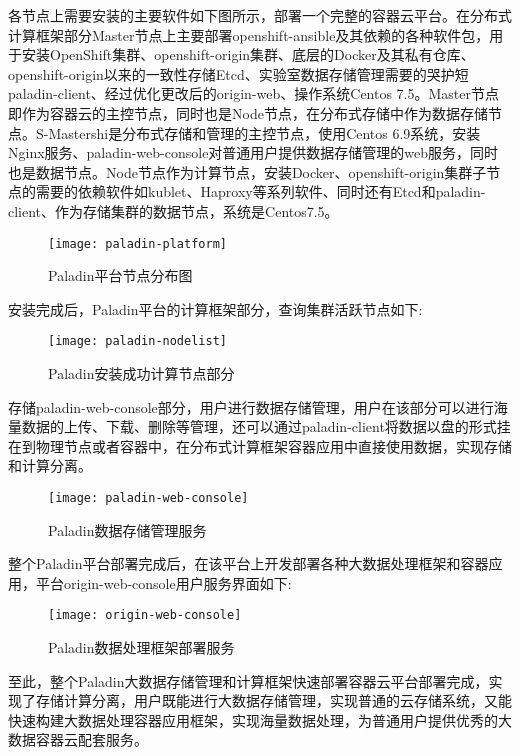 各节点上需要安装的主要软件如下图所示，部署一个完整的容器云平台。在分布式计算框架部分Master节点上主要部署openshift-ansible及其依赖的各种软件包，用于安装OpenShift集群、openshift-origin集群、底层的Docker及其私有仓库、openshift-origin以来的一致性存储Etcd、实验室数据存储管理需要的哭护短paladin-client、经过优化更改后的origin-web、操作系统Centos 7.5。Master节点即作为容器云的主控节点，同时也是Node节点，在分布式存储中作为数据存储节点。S-Mastershi是分布式存储和管理的主控节点，使用Centos 6.9系统，安装Nginx服务、paladin-web-console对普通用户提供数据存储管理的web服务，同时也是数据节点。Node节点作为计算节点，安装Docker、openshift-origin集群子节点的需要的依赖软件如kublet、Haproxy等系列软件、同时还有Etcd和paladin-client、作为存储集群的数据节点，系统是Centos7.5。
\begin{figure}[H] %
	\centering
	\texttt{[image: paladin-platform]}
	\caption{Paladin平台节点分布图}
\end{figure}

安装完成后，Paladin平台的计算框架部分，查询集群活跃节点如下:
\begin{figure}[H] %
	\centering
	\texttt{[image: paladin-nodelist]}
	\caption{Paladin安装成功计算节点部分}
\end{figure}

存储paladin-web-console部分，用户进行数据存储管理，用户在该部分可以进行海量数据的上传、下载、删除等管理，还可以通过paladin-client将数据以盘的形式挂在到物理节点或者容器中，在分布式计算框架容器应用中直接使用数据，实现存储和计算分离。
\begin{figure}[H] %
	\centering
	\texttt{[image: paladin-web-console]}
	\caption{Paladin数据存储管理服务}
\end{figure}

整个Paladin平台部署完成后，在该平台上开发部署各种大数据处理框架和容器应用，平台origin-web-console用户服务界面如下:
\begin{figure}[H] %
	\centering
	\texttt{[image: origin-web-console]}
	\caption{Paladin数据处理框架部署服务}
\end{figure}

至此，整个Paladin大数据存储管理和计算框架快速部署容器云平台部署完成，实现了存储计算分离，用户既能进行大数据存储管理，实现普通的云存储系统，又能快速构建大数据处理容器应用框架，实现海量数据处理，为普通用户提供优秀的大数据容器云配套服务。

